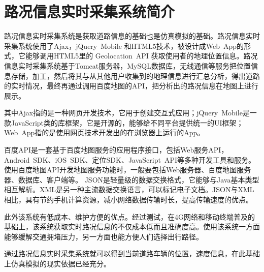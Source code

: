 \documentclass[a4paper,12pt]{article}
\numberwithin{equation}{section}
\newcommand{\upcite}[1]{\textsuperscript{\textsuperscript{\cite{#1}}}}
\begin{document}
	\section{路况信息实时采集系统简介}
	路况信息实时采集系统是获取道路信息的基础也是仿真模拟的基础。路况信息实时采集系统使用了Ajax，jQuery\ Mobile 和HTML5技术，被设计成Web\ App的形式，它能够调用HTML5里的 Geolocation\ API 获取使用者的地理位置信息。路况信息实时采集系统基于Tomcat服务器，MySQL数据库，无线通信等服务把位置信息存储，加工，然后将其与从其他用户收集到的地理信息进行汇总分析，得出道路的实时情况，最终再通过调用百度地图的API，把分析出的路况信息在地图上进行展示。\par 
	其中Ajax指的是一种网页开发技术，它用于创建交互式应用；jQuery\ Mobile是一款JavaScript类的库框架，它是开源的，能够给不同平台提供统一的UI框架；Web\ App指的是使用网页技术开发出的在浏览器上运行的App。\upcite{ref1,ref2}\par 
	百度API是一套基于百度地图服务的应用程序接口，包括Web服务API，Android\ SDK、iOS\ SDK、定位SDK、JavaScript\ API等多种开发工具和服务。使用百度地图API开发地图服务功能时，一般要包括Web服务器、百度地图服务器、数据库、客户端等。
	JSON是轻量级的数据交换格式，它能够与Java基本类型相互解析。XML是另一种主流数据交换语言，可以标记电子文档。JSON与XML相比，具有节约手机计算资源，减小网络数据传输时长，提高传输速度的优点。\par
	此外该系统有低成本、维护方便的优点。经过测试，在4G网络和移动终端普及的基础上，该系统获取实时路况信息的不仅成本低而且准确度高。使用该系统一方面能够缓解交通拥堵压力，另一方面也能方便人们选择出行路径。\par
	通过路况信息实时采集系统就可以得到当前道路车辆的位置，速度信息，在此基础上仿真模拟的现实依据已经充分。

	
\end{document}
